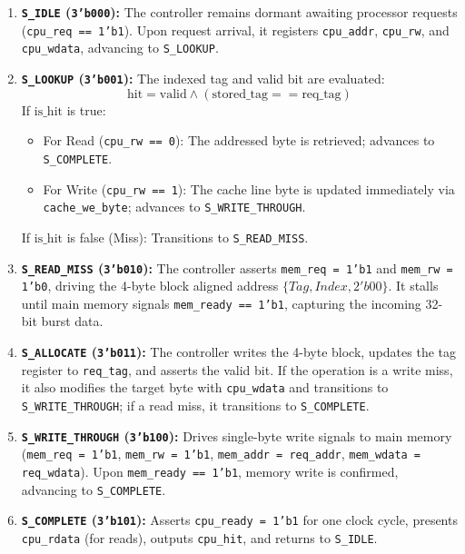 \documentclass[conference]{IEEEtran}
\begin{document}
\begin{enumerate}
    \item \textbf{\texttt{S\_IDLE} (\texttt{3'b000}):} The controller remains dormant awaiting processor requests (\texttt{cpu\_req == 1'b1}). Upon request arrival, it registers \texttt{cpu\_addr}, \texttt{cpu\_rw}, and \texttt{cpu\_wdata}, advancing to \texttt{S\_LOOKUP}.
    \item \textbf{\texttt{S\_LOOKUP} (\texttt{3'b001}):} The indexed tag and valid bit are evaluated:
    \begin{equation}
        \text{hit} = \text{valid} \land (\text{stored\_tag} == \text{req\_tag})
    \end{equation}
    If $\text{is\_hit}$ is true:
    \begin{itemize}
        \item For Read (\texttt{cpu\_rw == 0}): The addressed byte is retrieved; advances to \texttt{S\_COMPLETE}.
        \item For Write (\texttt{cpu\_rw == 1}): The cache line byte is updated immediately via \texttt{cache\_we\_byte}; advances to \texttt{S\_WRITE\_THROUGH}.
    \end{itemize}
    If $\text{is\_hit}$ is false (Miss): Transitions to \texttt{S\_READ\_MISS}.
    \item \textbf{\texttt{S\_READ\_MISS} (\texttt{3'b010}):} The controller asserts \texttt{mem\_req = 1'b1} and \texttt{mem\_rw = 1'b0}, driving the 4-byte block aligned address $\{Tag, Index, 2'b00\}$. It stalls until main memory signals \texttt{mem\_ready == 1'b1}, capturing the incoming 32-bit burst data.
    \item \textbf{\texttt{S\_ALLOCATE} (\texttt{3'b011}):} The controller writes the 4-byte block, updates the tag register to \texttt{req\_tag}, and asserts the valid bit. If the operation is a write miss, it also modifies the target byte with \texttt{cpu\_wdata} and transitions to \texttt{S\_WRITE\_THROUGH}; if a read miss, it transitions to \texttt{S\_COMPLETE}.
    \item \textbf{\texttt{S\_WRITE\_THROUGH} (\texttt{3'b100}):} Drives single-byte write signals to main memory (\texttt{mem\_req = 1'b1}, \texttt{mem\_rw = 1'b1}, \texttt{mem\_addr = req\_addr}, \texttt{mem\_wdata = req\_wdata}). Upon \texttt{mem\_ready == 1'b1}, memory write is confirmed, advancing to \texttt{S\_COMPLETE}.
    \item \textbf{\texttt{S\_COMPLETE} (\texttt{3'b101}):} Asserts \texttt{cpu\_ready = 1'b1} for one clock cycle, presents \texttt{cpu\_rdata} (for reads), outputs \texttt{cpu\_hit}, and returns to \texttt{S\_IDLE}.
\end{enumerate}
\end{document}
